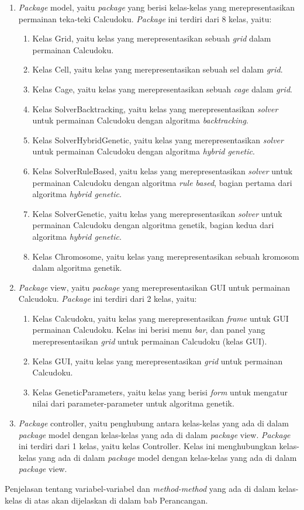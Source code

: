 \begin{enumerate}
\item \textit{Package} model, yaitu \textit{package} yang berisi kelas-kelas yang merepresentasikan permainan teka-teki Calcudoku. \textit{Package} ini terdiri dari 8 kelas, yaitu:
	\begin{enumerate}
	\item Kelas Grid, yaitu kelas yang merepresentasikan sebuah \textit{grid} dalam permainan Calcudoku.
	\item Kelas Cell, yaitu kelas yang merepresentasikan sebuah sel dalam \textit{grid}.
	\item Kelas Cage, yaitu kelas yang merepresentasikan sebuah \textit{cage} dalam \textit{grid}.
	\item Kelas SolverBacktracking, yaitu kelas yang merepresentasikan \textit{solver} untuk permainan Calcudoku dengan algoritma \textit{backtracking}.
	\item Kelas SolverHybridGenetic, yaitu kelas yang merepresentasikan \textit{solver} untuk permainan Calcudoku dengan algoritma \textit{hybrid genetic}.
	\item Kelas SolverRuleBased, yaitu kelas yang merepresentasikan \textit{solver} untuk permainan Calcudoku dengan algoritma \textit{rule based}, bagian pertama dari algoritma \textit{hybrid genetic}.
	\item Kelas SolverGenetic, yaitu kelas yang merepresentasikan \textit{solver} untuk permainan Calcudoku dengan algoritma genetik, bagian kedua dari algoritma \textit{hybrid genetic}.
	\item Kelas Chromosome, yaitu kelas yang merepresentasikan sebuah kromosom dalam algoritma genetik.
	\end{enumerate}
\item \textit{Package} view, yaitu \textit{package} yang merepresentasikan GUI untuk permainan Calcudoku. \textit{Package} ini terdiri dari 2 kelas, yaitu:
	\begin{enumerate}
	\item Kelas Calcudoku, yaitu kelas yang merepresentasikan \textit{frame} untuk GUI permainan Calcudoku. Kelas ini berisi menu \textit{bar}, dan panel yang merepresentasikan \textit{grid} untuk permainan Calcudoku (kelas GUI).
	\item Kelas GUI, yaitu kelas yang merepresentasikan \textit{grid} untuk permainan Calcudoku.
	\item Kelas GeneticParameters, yaitu kelas yang berisi \textit{form} untuk mengatur nilai dari parameter-parameter untuk algoritma genetik.
	\end{enumerate}
\item \textit{Package} controller, yaitu penghubung antara kelas-kelas yang ada di dalam \textit{package} model dengan kelas-kelas yang ada di dalam \textit{package} view. \textit{Package} ini terdiri dari 1 kelas, yaitu kelas Controller. Kelas ini menghubungkan kelas-kelas yang ada di dalam  \textit{package} model dengan kelas-kelas yang ada di dalam \textit{package} view.
\end{enumerate}

Penjelasan tentang variabel-variabel dan \textit{method-method} yang ada di dalam kelas-kelas di atas akan dijelaskan di dalam bab Perancangan.